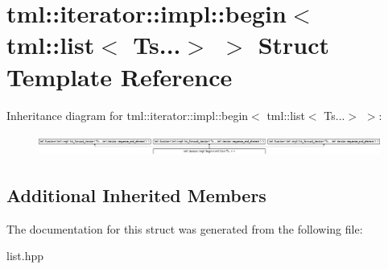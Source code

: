\hypertarget{structtml_1_1iterator_1_1impl_1_1begin_3_01tml_1_1list_3_01Ts_8_8_8_4_01_4}{\section{tml\+:\+:iterator\+:\+:impl\+:\+:begin$<$ tml\+:\+:list$<$ Ts...$>$ $>$ Struct Template Reference}
\label{structtml_1_1iterator_1_1impl_1_1begin_3_01tml_1_1list_3_01Ts_8_8_8_4_01_4}
}
Inheritance diagram for tml\+:\+:iterator\+:\+:impl\+:\+:begin$<$ tml\+:\+:list$<$ Ts...$>$ $>$\+:\begin{figure}[H]
\begin{center}
\leavevmode
\includegraphics[height=0.705734cm]{structtml_1_1iterator_1_1impl_1_1begin_3_01tml_1_1list_3_01Ts_8_8_8_4_01_4}
\end{center}
\end{figure}
\subsection*{Additional Inherited Members}


The documentation for this struct was generated from the following file\+:\begin{DoxyCompactItemize}
\item 
list.\+hpp\end{DoxyCompactItemize}
